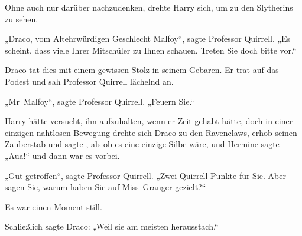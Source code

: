 Ohne auch nur darüber nachzudenken, drehte Harry sich, um zu den Slytherins zu sehen.

„Draco, vom Altehrwürdigen Geschlecht Malfoy“, sagte Professor Quirrell. „Es scheint, dass viele Ihrer Mitschüler zu Ihnen schauen. Treten Sie doch bitte vor.“

Draco tat dies mit einem gewissen Stolz in seinem Gebaren. Er trat auf das Podest und sah Professor Quirrell lächelnd an.

„Mr~Malfoy“, sagte Professor Quirrell. „Feuern Sie.“

Harry hätte versucht, ihn aufzuhalten, wenn er Zeit gehabt hätte, doch in einer einzigen nahtlosen Bewegung drehte sich Draco zu den Ravenclaws, erhob seinen Zauberstab und sagte , als ob es eine einzige Silbe wäre, und Hermine sagte „Aua!“ und dann war es vorbei.

„Gut getroffen“, sagte Professor Quirrell. „Zwei Quirrell-Punkte für Sie. Aber sagen Sie, warum haben Sie auf Miss~Granger gezielt?“

Es war einen Moment still.

Schließlich sagte Draco: „Weil sie am meisten herausstach.“

